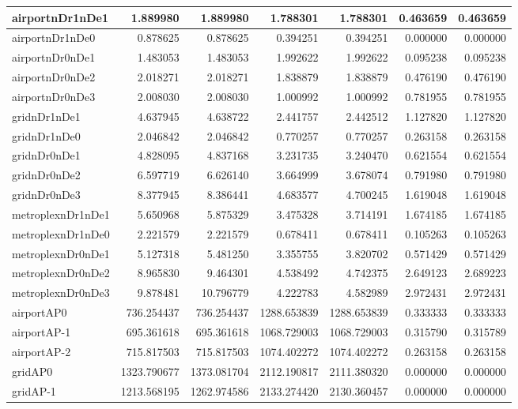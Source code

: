 \begin{longtable}{|l|r|r|r|r|r|r|}
\endlastfoot
airportnDr1nDe1 & 1.889980 & 1.889980 & 1.788301 & 1.788301 & 0.463659 & 0.463659 \\ \hline
airportnDr1nDe0 & 0.878625 & 0.878625 & 0.394251 & 0.394251 & 0.000000 & 0.000000 \\ \hline
airportnDr0nDe1 & 1.483053 & 1.483053 & 1.992622 & 1.992622 & 0.095238 & 0.095238 \\ \hline
airportnDr0nDe2 & 2.018271 & 2.018271 & 1.838879 & 1.838879 & 0.476190 & 0.476190 \\ \hline
airportnDr0nDe3 & 2.008030 & 2.008030 & 1.000992 & 1.000992 & 0.781955 & 0.781955 \\ \hline
gridnDr1nDe1 & 4.637945 & 4.638722 & 2.441757 & 2.442512 & 1.127820 & 1.127820 \\ \hline
gridnDr1nDe0 & 2.046842 & 2.046842 & 0.770257 & 0.770257 & 0.263158 & 0.263158 \\ \hline
gridnDr0nDe1 & 4.828095 & 4.837168 & 3.231735 & 3.240470 & 0.621554 & 0.621554 \\ \hline
gridnDr0nDe2 & 6.597719 & 6.626140 & 3.664999 & 3.678074 & 0.791980 & 0.791980 \\ \hline
gridnDr0nDe3 & 8.377945 & 8.386441 & 4.683577 & 4.700245 & 1.619048 & 1.619048 \\ \hline
metroplexnDr1nDe1 & 5.650968 & 5.875329 & 3.475328 & 3.714191 & 1.674185 & 1.674185 \\ \hline
metroplexnDr1nDe0 & 2.221579 & 2.221579 & 0.678411 & 0.678411 & 0.105263 & 0.105263 \\ \hline
metroplexnDr0nDe1 & 5.127318 & 5.481250 & 3.355755 & 3.820702 & 0.571429 & 0.571429 \\ \hline
metroplexnDr0nDe2 & 8.965830 & 9.464301 & 4.538492 & 4.742375 & 2.649123 & 2.689223 \\ \hline
metroplexnDr0nDe3 & 9.878481 & 10.796779 & 4.222783 & 4.582989 & 2.972431 & 2.972431 \\ \hline
airportAP0 & 736.254437 & 736.254437 & 1288.653839 & 1288.653839 & 0.333333 & 0.333333 \\ \hline
airportAP-1 & 695.361618 & 695.361618 & 1068.729003 & 1068.729003 & 0.315790 & 0.315789 \\ \hline
airportAP-2 & 715.817503 & 715.817503 & 1074.402272 & 1074.402272 & 0.263158 & 0.263158 \\ \hline
gridAP0 & 1323.790677 & 1373.081704 & 2112.190817 & 2111.380320 & 0.000000 & 0.000000 \\ \hline
gridAP-1 & 1213.568195 & 1262.974586 & 2133.274420 & 2130.360457 & 0.000000 & 0.000000 \\ \hline

\end{longtable}
